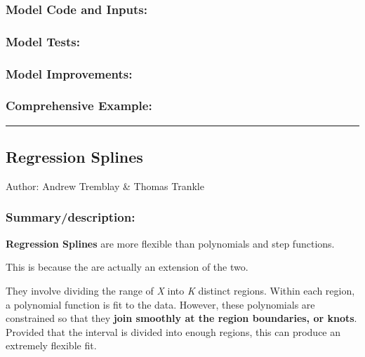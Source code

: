 \documentclass[
]{article}
\begin{document}
\hypertarget{model-code-and-inputs-5}{%
\subsubsection{Model Code and Inputs:}\label{model-code-and-inputs-5}}

\hypertarget{model-tests-5}{%
\subsubsection{Model Tests:}\label{model-tests-5}}

\hypertarget{model-improvements-5}{%
\subsubsection{Model Improvements:}\label{model-improvements-5}}

\hypertarget{comprehensive-example-5}{%
\subsubsection{Comprehensive Example:}\label{comprehensive-example-5}}

\begin{center}\rule{0.5\linewidth}{0.5pt}\end{center}

\hypertarget{regression-splines}{%
\subsection{Regression Splines}\label{regression-splines}}

Author: Andrew Tremblay \& Thomas Trankle

\hypertarget{summarydescription-6}{%
\subsubsection{Summary/description:}\label{summarydescription-6}}

\textbf{Regression Splines} are more flexible than polynomials and step
functions.

This is because the are actually an extension of the two.

They involve dividing the range of \emph{X} into \emph{K} distinct
regions. Within each region, a polynomial function is fit to the data.
However, these polynomials are constrained so that they \textbf{join
smoothly at the region boundaries, or knots}. Provided that the interval
is divided into enough regions, this can produce an extremely flexible
fit.
\end{document}

